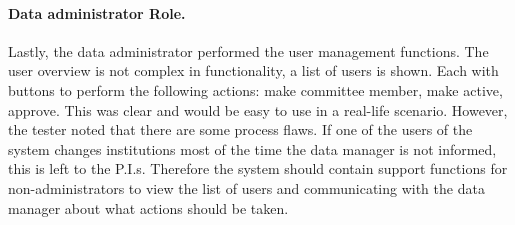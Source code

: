 \paragraph{Data administrator Role.}
Lastly, the data administrator performed the user management functions.
The user overview is not complex in functionality, a list of users is shown.
Each with buttons to perform the following actions: make committee member, make active, approve.
This was clear and would be easy to use in a real-life scenario.
However, the tester noted that there are some process flaws.
If one of the users of the system changes institutions most of the time the data manager is not informed, this is left to the P.I.s.
Therefore the system should contain support functions for non-administrators to view the list of users and communicating with the data manager about what actions should be taken.